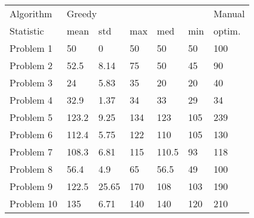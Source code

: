 \begin{tabular}{lllllll}
\toprule
Algorithm & \multicolumn{5}{l}{Greedy} & Manual \\
Statistic &   mean &    std &  max &    med &  min & optim. \\
\midrule
Problem 1  &     50 &      0 &   50 &     50 &   50 &    100 \\
Problem 2  &   52.5 &   8.14 &   75 &     50 &   45 &     90 \\
Problem 3  &     24 &   5.83 &   35 &     20 &   20 &     40 \\
Problem 4  &   32.9 &   1.37 &   34 &     33 &   29 &     34 \\
Problem 5  &  123.2 &   9.25 &  134 &    123 &  105 &    239 \\
Problem 6  &  112.4 &   5.75 &  122 &    110 &  105 &    130 \\
Problem 7  &  108.3 &   6.81 &  115 &  110.5 &   93 &    118 \\
Problem 8  &   56.4 &    4.9 &   65 &   56.5 &   49 &    100 \\
Problem 9  &  122.5 &  25.65 &  170 &    108 &  103 &    190 \\
Problem 10 &    135 &   6.71 &  140 &    140 &  120 &    210 \\
\bottomrule
\end{tabular}
